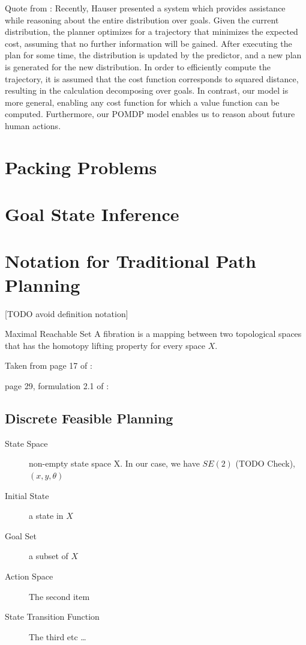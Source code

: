 Quote from \cite{javdani2015shared}:
Recently,  Hauser  presented  a  system  which  provides
assistance  while  reasoning  about  the  entire  distribution  over
goals.  Given  the  current  distribution,  the  planner  optimizes
for  a  trajectory  that  minimizes  the  expected  cost,  assuming
that no further information will be gained. After executing the
plan for some time, the distribution is updated by the predictor,
and a new plan is generated for the new distribution. In order
to  efficiently  compute  the  trajectory,  it  is  assumed  that  the
cost function corresponds to squared distance, resulting in the
calculation decomposing over goals. In contrast, our model is
more  general,  enabling  any  cost  function  for  which  a  value
function  can  be  computed.  Furthermore,  our  POMDP  model
enables us to reason about future human actions.  \cite{hauser2013recognition}
\section{Packing Problems}
\section{Goal State Inference}
\section{Notation for Traditional Path Planning}

[TODO avoid definition notation]
\theoremstyle{definition}
\begin{definition}{Maximal Reachable Set}
A fibration is a mapping between two topological spaces that has the homotopy lifting property for every space $X$.
\end{definition}

Taken from page 17 of \cite{lavalle2006planning}:


page 29, formulation 2.1 of \cite{lavalle2006planning}:
\subsection{Discrete Feasible Planning}
\begin{description}
  \item[State Space] non-empty state space X. In our case, we have
  $SE(2)$ (TODO Check), $(x,y,\theta)$
  \item[Initial State] a state in $X$
  \item[Goal Set] a subset of $X$
  \item[Action Space] The second item
  \item[State Transition Function] The third etc \ldots
\end{description}

